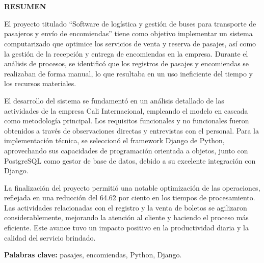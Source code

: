 \chapter*{} %
\thispagestyle{plain}  %

\begin{center}
	{\bfseries\fontsize{13pt}{16pt}\selectfont RESUMEN}
\end{center}

\vspace{1em}

El proyecto titulado “Software de logística y gestión de buses para transporte de pasajeros y envío de encomiendas” tiene como objetivo implementar un sistema computarizado que optimice los servicios de venta y reserva de pasajes, así como la gestión de la recepción y entrega de encomiendas en la empresa. Durante el análisis de procesos, se identificó que los registros de pasajes y encomiendas se realizaban de forma manual, lo que resultaba en un uso ineficiente del tiempo y los recursos materiales.

El desarrollo del sistema se fundamentó en un análisis detallado de las actividades de la empresa Cali Internacional, empleando el modelo en cascada como metodología principal. Los requisitos funcionales y no funcionales fueron obtenidos a través de observaciones directas y entrevistas con el personal. Para la implementación técnica, se seleccionó el framework Django de Python, aprovechando sus capacidades de programación orientada a objetos, junto con PostgreSQL como gestor de base de datos, debido a su excelente integración con Django.

La finalización del proyecto permitió una notable optimización de las operaciones, reflejada en una reducción del 64.62 por ciento en los tiempos de procesamiento. Las actividades relacionadas con el registro y la venta de boletos se agilizaron considerablemente, mejorando la atención al cliente y haciendo el proceso más eficiente. Este avance tuvo un impacto positivo en la productividad diaria y la calidad del servicio brindado.

\vspace{1em}
\noindent\textbf{Palabras clave:} pasajes, encomiendas, Python, Django.
